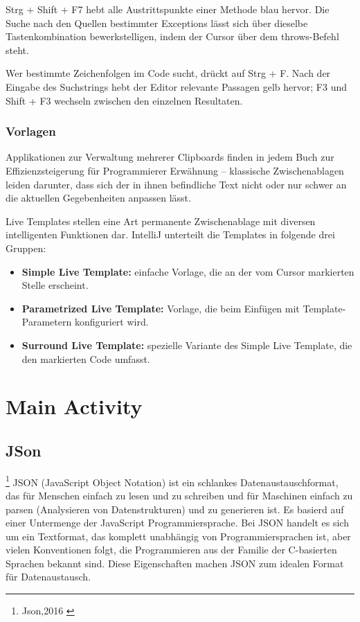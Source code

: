Strg + Shift + F7 hebt alle Austrittspunkte einer Methode blau hervor. Die Suche nach den Quellen bestimmter Exceptions lässt sich über dieselbe Tastenkombination bewerkstelligen, indem der Cursor über dem throws-Befehl steht.

Wer bestimmte Zeichenfolgen im Code sucht, drückt auf Strg + F. Nach der Eingabe des Suchstrings hebt der Editor relevante Passagen gelb hervor; F3 und Shift + F3 wechseln zwischen den einzelnen Resultaten.

\subsection{Vorlagen}
Applikationen zur Verwaltung mehrerer Clipboards finden in jedem Buch zur Effizienzsteigerung für Programmierer Erwähnung – klassische Zwischenablagen leiden darunter, dass sich der in ihnen befindliche Text nicht oder nur schwer an die aktuellen Gegebenheiten anpassen lässt.

Live Templates stellen eine Art permanente Zwischenablage mit diversen intelligenten Funktionen dar. IntelliJ unterteilt die Templates in folgende drei Gruppen:
\begin{itemize}
\item \textbf{Simple Live Template:} einfache Vorlage, die an der vom Cursor markierten Stelle erscheint.
\item \textbf{Parametrized Live Template:} Vorlage, die beim Einfügen mit Template-Parametern konfiguriert wird.
\item \textbf{Surround Live Template:} spezielle Variante des Simple Live Template, die den markierten Code umfasst.
\end{itemize}


\chapter{Main Activity}
\section{JSon}
\footnote{Json,2016 \cite{Json2016}}
JSON (JavaScript Object Notation) ist ein schlankes Datenaustauschformat, das für Menschen einfach zu lesen und zu schreiben und für Maschinen einfach zu parsen (Analysieren von Datenstrukturen) und zu generieren ist. Es basierd auf einer Untermenge der JavaScript Programmiersprache.
Bei JSON handelt es sich um ein Textformat, das komplett unabhängig von Programmiersprachen ist, aber vielen Konventionen folgt, die Programmieren aus der Familie der C-basierten Sprachen bekannt sind. Diese Eigenschaften machen JSON zum idealen Format für Datenaustausch.

